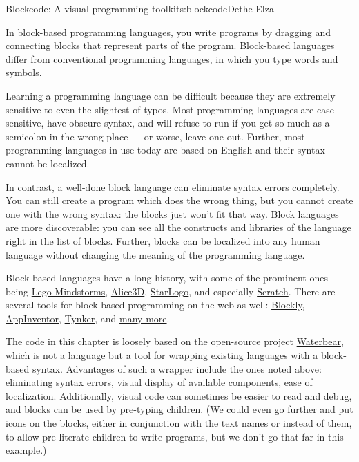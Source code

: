 \begin{aosachapter}{Blockcode: A visual programming toolkit}{s:blockcode}{Dethe Elza}

In block-based programming languages, you write programs by dragging and
connecting blocks that represent parts of the program. Block-based
languages differ from conventional programming languages, in which you
type words and symbols.

Learning a programming language can be difficult because they are
extremely sensitive to even the slightest of typos. Most programming
languages are case-sensitive, have obscure syntax, and will refuse to
run if you get so much as a semicolon in the wrong place --- or worse,
leave one out. Further, most programming languages in use today are
based on English and their syntax cannot be localized.

In contrast, a well-done block language can eliminate syntax errors
completely. You can still create a program which does the wrong thing,
but you cannot create one with the wrong syntax: the blocks just won't
fit that way. Block languages are more discoverable: you can see all the
constructs and libraries of the language right in the list of blocks.
Further, blocks can be localized into any human language without
changing the meaning of the programming language.


Block-based languages have a long history, with some of the prominent
ones being \href{http://www.lego.com/en-us/mindstorms/}{Lego
Mindstorms}, \href{http://www.alice.org/index.php}{Alice3D},
\href{http://education.mit.edu/projects/starlogo-tng}{StarLogo}, and
especially \href{http://scratch.mit.edu/}{Scratch}. There are several
tools for block-based programming on the web as well:
\href{https://developers.google.com/blockly/}{Blockly},
\href{http://appinventor.mit.edu/explore/}{AppInventor},
\href{http://www.tynker.com/}{Tynker}, and
\href{http://en.wikipedia.org/wiki/Visual_programming_language}{many
more}.

The code in this chapter is loosely based on the open-source project
\href{http://waterbearlang.com/}{Waterbear}, which is not a language but
a tool for wrapping existing languages with a block-based syntax.
Advantages of such a wrapper include the ones noted above: eliminating
syntax errors, visual display of available components, ease of
localization. Additionally, visual code can sometimes be easier to read
and debug, and blocks can be used by pre-typing children. (We could even
go further and put icons on the blocks, either in conjunction with the
text names or instead of them, to allow pre-literate children to write
programs, but we don't go that far in this example.)


\end{aosachapter}
